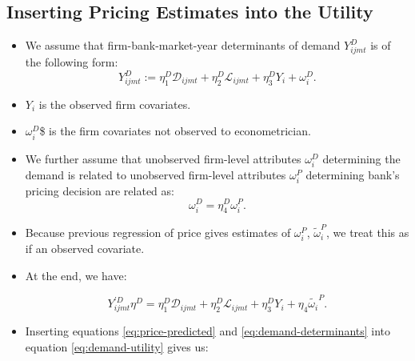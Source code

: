 \documentclass[]{book}
\providecommand{\tightlist}{%
  \setlength{\itemsep}{0pt}\setlength{\parskip}{0pt}}
\begin{document}
\subsection{Inserting Pricing Estimates into the
Utility}\label{inserting-pricing-estimates-into-the-utility}

\begin{itemize}
\tightlist
\item
  We assume that firm-bank-market-year determinants of demand
  \(Y_{ijmt}^D\) is of the following form: \[
  Y_{ijmt}^D := \eta_1^D \mathcal{D}_{ijmt} + \eta_2^D \mathcal{L}_{ijmt} + \eta_3^D Y_i + \omega_i^D. 
  \]
\item
  \(Y_i\) is the observed firm covariates.
\item
  \(\omega_i^D\)\$ is the firm covariates not observed to
  econometrician.
\item
  We further assume that unobserved firm-level attributes \(\omega_i^D\)
  determining the demand is related to unobserved firm-level attributes
  \(\omega_i^P\) determining bank's pricing decision are related as: \[
  \omega_i^D = \eta_4^D \omega_i^P.
  \]
\item
  Because previous regression of price gives estimates of
  \(\omega_i^P\), \(\tilde{\omega}_i^P\), we treat this as if an
  observed covariate.
\item
  At the end, we have:

  \begin{equation}
  Y_{ijmt}^{\prime D} \eta^D = \eta_1^D \mathcal{D}_{ijmt} + \eta_2^D \mathcal{L}_{ijmt} + \eta_3^D Y_i + \eta_4 \tilde{\omega_i}^P. \label{eq:demand-determinants}
  \end{equation}
\item
  Inserting equations \eqref{eq:price-predicted} and
  \eqref{eq:demand-determinants} into equation \eqref{eq:demand-utility}
  gives us:


\end{itemize}
\end{document}
